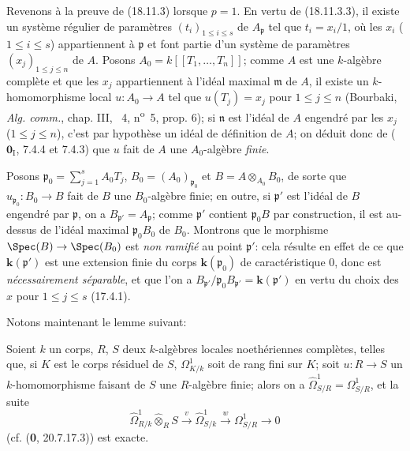 Revenons à la preuve de (18.11.3) lorsque $p=1$. En vertu de (18.11.3.3), il existe un système régulier de paramètres $(t_i)_{1\leq i\leq s}$ de $A_{\mathfrak p}$ tel que $t_i=x_i/1$, où les $x_i$ ($1\leq i\leq s$) appartiennent à $\mathfrak p$ et font partie d'un système de paramètres $(x_j)_{1\leq j\leq n}$ de $A$. Posons $A_0=k[[T_1,\ldots,T_n]]$; comme $A$ est une $k$-algèbre complète et que les $x_j$ appartiennent à l'idéal maximal $\mathfrak m$ de $A$, il existe un $k$-homomorphisme local $u:A_0\to A$ tel que $u(T_j)=x_j$ pour $1\leq j\leq n$ (Bourbaki, \emph{Alg. comm.}, chap. III, \textsection~4, n\textsuperscript{o}~5, prop. 6); si $\mathfrak n$ est l'idéal de $A$ engendré par les $x_j$ ($1\leq j\leq n$), c'est par hypothèse un idéal de définition de $A$; on déduit donc de ($\mathbf{0}_{\mathrm I}$, 7.4.4 et 7.4.3) que $u$ fait de $A$ une $A_0$-algèbre \emph{finie}.

Posons $\mathfrak p_0=\sum_{j=1}^s A_0T_j$, $B_0=(A_0)_{\mathfrak p_0}$ et $B=A\otimes_{A_0}B_0$, de sorte que $u_{\mathfrak p_0}:B_0\to B$ fait
de $B$ une $B_0$-algèbre finie; en outre, si $\mathfrak p'$ est l'idéal de $B$ engendré par $\mathfrak p$, on a $B_{\mathfrak p'}=A_{\mathfrak p}$; comme $\mathfrak p'$ contient $\mathfrak p_0B$ par construction, il est au-dessus de l'idéal maximal $\mathfrak p_0B_0$ de $B_0$. Montrons que le morphisme $\Spec(B)\to\Spec(B_0)$ est \emph{non ramifié} au point $\mathfrak p'$: cela résulte en effet de ce que $\boldsymbol{k}(\mathfrak p')$ est une extension finie du corps $\boldsymbol{k}(\mathfrak p_0)$ de caractéristique 0, donc est \emph{nécessairement séparable}, et que l'on a $B_{\mathfrak p'}/\mathfrak p_0B_{\mathfrak p'}=\boldsymbol{k}(\mathfrak p')$ en vertu du choix des $x$ pour $1\leq j\leq s$ (17.4.1).

Notons maintenant le lemme suivant:

\begin{lemma}[18.11.3.5]
\label{IV.18.11.3.5}
Soient $k$ un corps, $R$, $S$ deux $k$-algèbres locales noethériennes complètes, telles que, si $K$ est le corps résiduel de $S$, $\Omega^1_{K/k}$ soit de rang fini sur $K$; soit $u:R\to S$ un $k$-homomorphisme faisant de $S$ une $R$-algèbre finie; alors on a $\hat{\Omega}^1_{S/R}=\Omega^1_{S/R}$, et la suite
\begin{equation}
\label{IV.18.11.3.6}
\tag{18.11.3.6}
  \hat{\Omega}^1_{R/k}\widehat{\otimes}_R S\xrightarrow{v}\hat{\Omega}^1_{S/k}\xrightarrow{w}\Omega^1_{S/R}\to0
\end{equation}
\textup{(cf. (\textbf{0}, 20.7.17.3))} est exacte.
\end{lemma}

